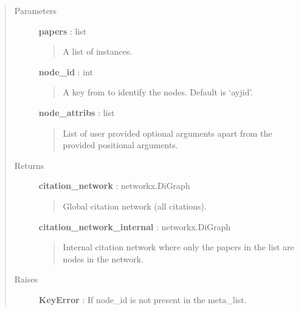 \documentclass[letterpaper,10pt,english]{sphinxmanual}
\begin{document}
\begin{fulllineitems}
\begin{quote}\begin{description}
\item[{Parameters }] \leavevmode
\textbf{papers} : list
\begin{quote}

A list of {\hyperref[tethne:tethne.data.Paper]{}} instances.
\end{quote}

\textbf{node\_id} : int
\begin{quote}

A key from {\hyperref[tethne:tethne.data.Paper]{}} to identify the nodes. Default is `ayjid'.
\end{quote}

\textbf{node\_attribs} : list
\begin{quote}

List of user provided optional arguments apart from the provided
positional arguments.
\end{quote}

\item[{Returns }] \leavevmode
\textbf{citation\_network} : networkx.DiGraph
\begin{quote}

Global citation network (all citations).
\end{quote}

\textbf{citation\_network\_internal} : networkx.DiGraph
\begin{quote}

Internal citation network where only the papers in the list are nodes in
the network.
\end{quote}

\item[{Raises }] \leavevmode
\textbf{KeyError} : If node\_id is not present in the meta\_list.

\end{description}\end{quote}

\end{fulllineitems}

\end{document}
